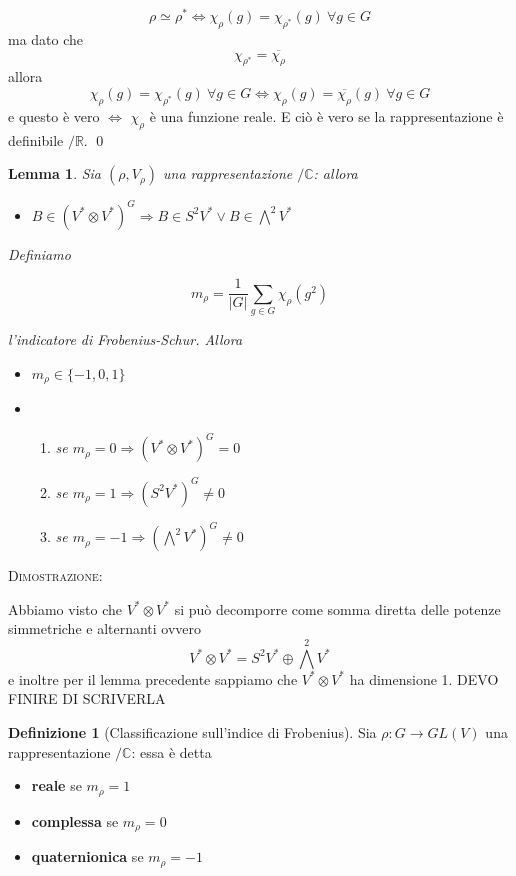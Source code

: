 \documentclass[11pt]{article}
\theoremstyle{plain}
\newtheorem{lemma}[thm]{Lemma}
\theoremstyle{definition}
\newtheorem{defn}{Definizione}[section]
\theoremstyle{remark}
\newcommand{\C}{\mathbb{C}}
\newcommand{\R}{\mathbb{R}}
\newcommand{\dsum}{\displaystyle\sum}
\begin{document}
\[\rho \simeq \rho^* \Leftrightarrow \chi_\rho(g)=\chi_{\rho^*}(g)\ \forall g\in G\]
ma dato che 
\[\chi_{\rho^*}=\overline{\chi_\rho}\]
allora
\[ \chi_\rho(g)=\chi_{\rho^*}(g)\ \forall g\in G\Leftrightarrow \chi_\rho(g)=\overline{\chi_\rho}(g)\ \forall g\in G\]
e questo è vero $\Leftrightarrow $ $\chi_\rho$ è una funzione reale. E ciò è vero se la rappresentazione è definibile $/\R$. \qed 

\begin{lemma}
Sia $(\rho, V_\rho)$ una rappresentazione $/\C$: allora
\begin{itemize}
\item  $B \in (V^* \otimes V^*)^G \Rightarrow B \in S^2V^* \vee B \in \bigwedge ^2 V^*$
\end{itemize}
Definiamo 

\[ m_\rho = \dfrac{1}{|G|} \dsum_{g \in G} \chi_{\rho}(g^2)\]

l'indicatore di Frobenius-Schur. Allora
\begin{itemize}
\item  $m_\rho \in \{-1, 0, 1 \}$
\item{ \begin{enumerate}

\item se $m_\rho = 0 \Rightarrow (V^*\otimes V^*)^G = 0$
\item se $m_\rho = 1 \Rightarrow (S^2 V^*)^G \neq 0$
\item se $m_\rho = -1 \Rightarrow (\bigwedge^2 V^*)^G \neq 0$
\end{enumerate}
}

\end{itemize}
\end{lemma}



\textsc{Dimostrazione:}

Abbiamo visto che $V^*\otimes V^*$ si può decomporre come somma diretta delle potenze simmetriche e alternanti ovvero
\[V^*\otimes V^*=S^2V^*\oplus  \bigwedge ^2 V^*\]
e inoltre per il lemma precedente sappiamo che $V^*\otimes V^*$ ha dimensione 1. 
DEVO FINIRE DI SCRIVERLA 

\begin{defn}[Classificazione sull'indice di Frobenius]
Sia $\rho:G\rightarrow GL(V)$ una rappresentazione $/\C$: essa è detta
\begin{itemize}
\item \textbf{reale} se $m_\rho = 1$  
\item \textbf{complessa} se $m_\rho = 0$ 
\item \textbf{quaternionica} se $m_\rho = -1$
\end{itemize}
\end{defn}
\end{document}
